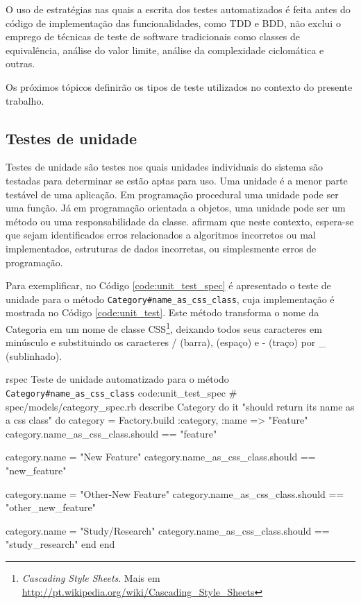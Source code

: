 O uso de estratégias nas quais a escrita dos testes automatizados é feita antes do código de implementação das funcionalidades, como TDD e BDD, não exclui o emprego de técnicas de teste de software tradicionais como classes de equivalência, análise do valor limite, análise da complexidade ciclomática e outras.

Os próximos tópicos definirão os tipos de teste utilizados no contexto do presente trabalho.


\subsection{Testes de unidade}
\label{sub:testes_de_unidade}

Testes de unidade são testes nos quais unidades individuais do sistema são testadas para determinar se estão aptas para uso. Uma unidade é a menor parte testável de uma aplicação. Em programação procedural uma unidade pode ser uma função. Já em programação orientada a objetos, uma unidade pode ser um método ou uma responsabilidade da classe.  afirmam que neste contexto, espera-se que sejam identificados erros relacionados a algoritmos incorretos ou mal implementados, estruturas de dados incorretas, ou simplesmente erros de programação.

Para exemplificar, no Código \ref{code:unit_test_spec} é apresentado o teste de unidade para o método \texttt{Category\#name\_as\_css\_class}, cuja implementação é mostrada no Código \ref{code:unit_test}. Este método transforma o nome da Categoria em um nome de classe CSS\footnote{\textit{Cascading Style Sheets}. Mais em \url{http://pt.wikipedia.org/wiki/Cascading_Style_Sheets}}, deixando todos seus caracteres em minúsculo e substituindo os caracteres / (barra),  (espaço) e - (traço) por \_ (sublinhado).

\begin{mycode}{rspec}%
{Teste de unidade automatizado para o método \texttt{Category\#name\_as\_css\_class} }{code:unit_test_spec}
# spec/models/category_spec.rb
describe Category do
  it "should return its name as a css class" do
    category = Factory.build :category, :name => "Feature"
    category.name_as_css_class.should == "feature"

    category.name = "New Feature"
    category.name_as_css_class.should == "new_feature"

    category.name = "Other-New Feature"
    category.name_as_css_class.should == "other_new_feature"

    category.name = "Study/Research"
    category.name_as_css_class.should == "study_research"
  end
end
\end{mycode}

